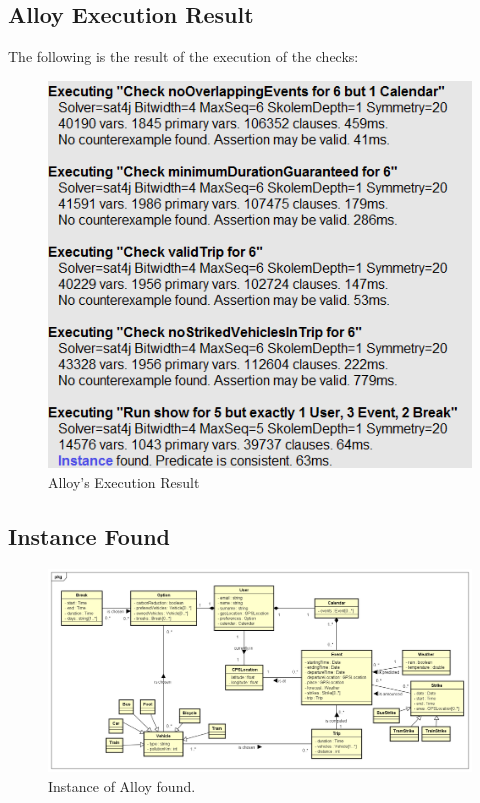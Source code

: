 \subsection{Alloy Execution Result}
The following is the result of the execution of the checks:\\
\begin{figure}[H]
\begin{center}
		\includegraphics[width=\textwidth, keepaspectratio=true]{Img/AlloyEx}
		\caption{Alloy's Execution Result}
\end{center}
\end{figure}
\clearpage
\subsection*{Instance Found}
\begin{figure}[H]
\begin{center}
		\includegraphics[width=\textwidth, angle=90,keepaspectratio=true]{Img/ClassDiagram1}
		\caption{Instance of Alloy found.}
		\label{AlloyInstance}
\end{center}
\end{figure}